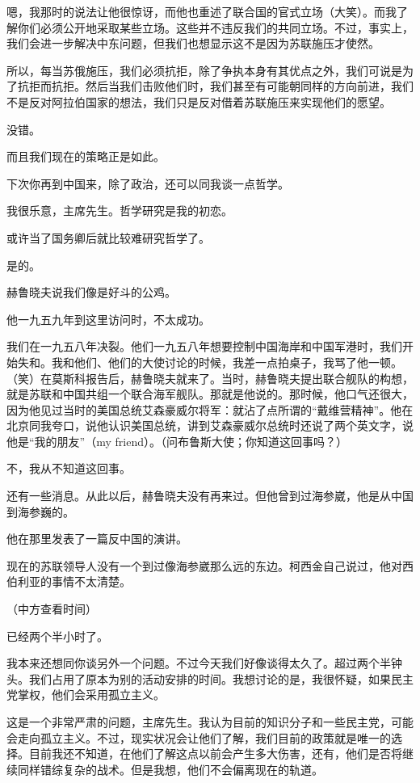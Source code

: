 嗯，我那时的说法让他很惊讶，而他也重述了联合国的官式立场（大笑）。而我了解你们必须公开地采取某些立场。这些并不违反我们的共同立场。不过，事实上，我们会进一步解决中东问题，但我们也想显示这不是因为苏联施压才使然。

所以，每当苏俄施压，我们必须抗拒，除了争执本身有其优点之外，我们可说是为了抗拒而抗拒。然后当我们击败他们时，我们甚至有可能朝同样的方向前进，我们不是反对阿拉伯国家的想法，我们只是反对借着苏联施压来实现他们的愿望。

没错。

而且我们现在的策略正是如此。

下次你再到中国来，除了政治，还可以同我谈一点哲学。

我很乐意，主席先生。哲学研究是我的初恋。

或许当了国务卿后就比较难研究哲学了。

是的。

赫鲁晓夫说我们像是好斗的公鸡。

他一九五九年到这里访问时，不太成功。

我们在一九五八年决裂。他们一九五八年想要控制中国海岸和中国军港时，我们开始失和。我和他们、他们的大使讨论的时候，我差一点拍桌子，我骂了他一顿。（笑）在莫斯科报告后，赫鲁晓夫就来了。当时，赫鲁晓夫提出联合舰队的构想，就是苏联和中国共组一个联合海军舰队。那就是他说的。那时候，他口气还很大，因为他见过当时的美国总统艾森豪威尔将军：就沾了点所谓的“戴维营精神”。他在北京同我夸口，说他认识美国总统，讲到艾森豪威尔总统时还说了两个英文字，说他是“我的朋友”（my friend）。（问布鲁斯大使；你知道这回事吗？）

不，我从不知道这回事。

还有一些消息。从此以后，赫鲁晓夫没有再来过。但他曾到过海参崴，他是从中国到海参巍的。

他在那里发表了一篇反中国的演讲。

现在的苏联领导人没有一个到过像海参崴那么远的东边。柯西金自己说过，他对西伯利亚的事情不太清楚。

（中方查看时间）

已经两个半小时了。

我本来还想同你谈另外一个问题。不过今天我们好像谈得太久了。超过两个半钟头。我们占用了原本为别的活动安排的时间。我想讨论的是，我很怀疑，如果民主党掌权，他们会采用孤立主义。

这是一个非常严肃的问题，主席先生。我认为目前的知识分子和一些民主党，可能会走向孤立主义。不过，现实状况会让他们了解，我们目前的政策就是唯一的选择。目前我还不知道，在他们了解这点以前会产生多大伤害，还有，他们是否将继续同样错综复杂的战术。但是我想，他们不会偏离现在的轨道。

